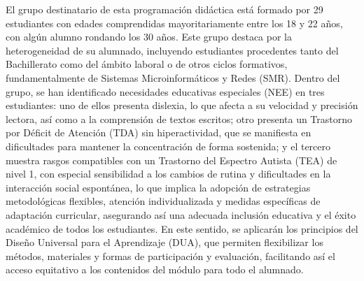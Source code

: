 El grupo destinatario de esta programación didáctica está formado por 29 estudiantes con edades comprendidas mayoritariamente entre los 18 y 22 años, con algún alumno rondando los 30 años. Este grupo destaca por la heterogeneidad de su alumnado, incluyendo estudiantes procedentes tanto del Bachillerato como del ámbito laboral o de otros ciclos formativos, fundamentalmente de Sistemas Microinformáticos y Redes (SMR). Dentro del grupo, se han identificado necesidades educativas especiales (NEE) en tres estudiantes: uno de ellos presenta dislexia, lo que afecta a su velocidad y precisión lectora, así como a la comprensión de textos escritos; otro presenta un Trastorno por Déficit de Atención (TDA) sin hiperactividad, que se manifiesta en dificultades para mantener la concentración de forma sostenida; y el tercero muestra rasgos compatibles con un Trastorno del Espectro Autista (TEA) de nivel 1, con especial sensibilidad a los cambios de rutina y dificultades en la interacción social espontánea, lo que implica la adopción de estrategias metodológicas flexibles, atención individualizada y medidas específicas de adaptación curricular, asegurando así una adecuada inclusión educativa y el éxito académico de todos los estudiantes. En este sentido, se aplicarán los principios del Diseño Universal para el Aprendizaje (DUA), que permiten flexibilizar los métodos, materiales y formas de participación y evaluación, facilitando así el acceso equitativo a los contenidos del módulo para todo el alumnado.







